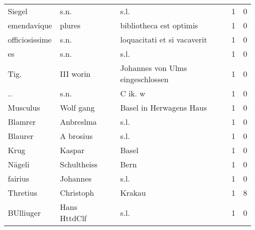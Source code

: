 \begin{center}
\begin{tiny}
\begin{longtabu}{llllrr}
                   Siegel &                               s.n. &             &                                        s.l. &          1 &         0 \\
              emendavique &                             plures &             &                     bibliotheca est optimis &          1 &         0 \\
           officiosissime &                               s.n. &             &                 loquacitati et si vacaverit &          1 &         0 \\
                       es &                               s.n. &             &                                        s.l. &          1 &         0 \\
                     Tig. &                          III worin &             &            Johannes von Ulms eingeschlossen &          1 &         0 \\
                       .. &                               s.n. &             &                                     C ik. w &          1 &         0 \\
                 Musculus &                          Wolf gang &             &                     Basel in Herwagens Haus &          1 &         0 \\
                  Blamrer &                          Anbreslma &             &                                        s.l. &          1 &         0 \\
                  Blaurer &                          A brosius &             &                                        s.l. &          1 &         0 \\
                     Krug &                             Kaspar &             &                                       Basel &          1 &         0 \\
                   Nägeli &                        Schultheiss &             &                                        Bern &          1 &         0 \\
                  fairius &                           Johannes &             &                                        s.l. &          1 &         0 \\
                 Thretius &                          Christoph &             &                                      Krakau &          1 &         8 \\
                BUlliuger &                       Hans HttdClf &             &                                        s.l. &          1 &         0 \\

\end{longtabu}
\end{tiny}
\end{center}
